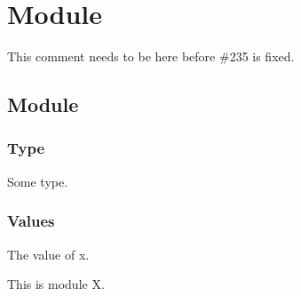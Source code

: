 \section{Module }\label{Nested}%
This comment needs to be here before \#235 is fixed.

\subsection{Module\label{module}}%
\label{Nested-module-X}\begin{ocamlindent}\subsubsection{Type\label{type}}%
\label{Nested-X-type-t}\begin{ocamlindent}Some type.\end{ocamlindent}%
\medbreak
\subsubsection{Values\label{values}}%
\label{Nested-X-val-x}\begin{ocamlindent}The value of x.\end{ocamlindent}%
\medbreak
\end{ocamlindent}%
\begin{ocamlindent}This is module X.\end{ocamlindent}%
\medbreak

